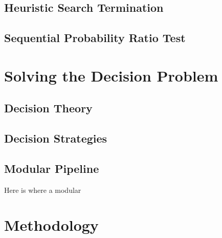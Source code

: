 \subsection{Heuristic Search Termination}
\subsection{Sequential Probability Ratio Test}

\section{Solving the Decision Problem}
\subsection{Decision Theory}

\subsection{Decision Strategies}

\subsection{Modular Pipeline}
Here is where a modular 


\section{Methodology}
